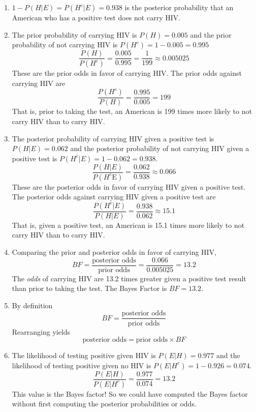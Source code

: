 \documentclass[
]{book}
\providecommand{\tightlist}{%
  \setlength{\itemsep}{0pt}\setlength{\parskip}{0pt}}
\newcommand{\E}{\textrm{E}}
\theoremstyle{definition}
\theoremstyle{definition}
\theoremstyle{definition}
\theoremstyle{remark}
\begin{document}
\begin{enumerate}
\def\labelenumi{\arabic{enumi}.}
\tightlist
\item
  \(1-P(H|E) = P(H^c|E)=0.938\) is the posterior probability that an American who has a positive test does not carry HIV.
\item
  The prior probability of carrying HIV is \(P(H)=0.005\) and the prior probability of not carrying HIV is \(P(H^c) = 1-0.005 = 0.995\)
  \[
  \frac{P(H)}{P(H^c)} = \frac{0.005}{0.995} = \frac{1}{199} \approx 0.005025
  \]
  These are the prior odds in favor of carrying HIV. The prior odds against carrying HIV are
  \[
  \frac{P(H^c)}{P(H)} = \frac{0.995}{0.005} = 199
  \]
  That is, prior to taking the test, an American is 199 times more likely to not carry HIV than to carry HIV.
\item
  The posterior probability of carrying HIV given a positive test is \(P(H|E)=0.062\) and the posterior probability of not carrying HIV given a positive test is \(P(H^c|E) = 1-0.062 = 0.938\).
  \[
  \frac{P(H|E)}{P(H^c\E)} = \frac{0.062}{0.938} \approx 0.066
  \]
  These are the posterior odds in favor of carrying HIV given a positive test. The posterior odds against carrying HIV given a positive test are
  \[
  \frac{P(H^c|E)}{P(H|E)} = \frac{0.938}{0.062} \approx 15.1
  \]
  That is, given a positive test, an American is 15.1 times more likely to not carry HIV than to carry HIV.
\item
  Comparing the prior and posterior odds in favor of carrying HIV,
  \[
  BF = \frac{\text{posterior odds}}{\text{prior odds}} = \frac{0.066}{0.005025} = 13.2
  \]
  The \emph{odds} of carrying HIV are 13.2 times greater given a positive test result than prior to taking the test. The Bayes Factor is \(BF = 13.2\).
\item
  By definition
  \[
  BF = \frac{\text{posterior odds}}{\text{prior odds}}
  \]
  Rearranging yields
  \[
  \text{posterior odds} = \text{prior odds}\times BF
  \]
\item
  The likelihood of testing positive given HIV is \(P(E|H) = 0.977\) and the likelihood of testing positive given no HIV is \(P(E|H^c) = 1-0.926 = 0.074\).
  \[
   \frac{P(E|H)}{P(E|H^c)} = \frac{0.977}{0.074} = 13.2
  \]
  This value is the Bayes factor! So we could have computed the Bayes factor without first computing the posterior probabilities or odds.
\end{enumerate}
\end{document}
